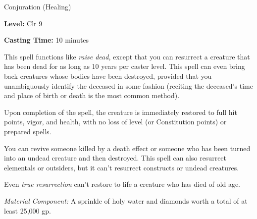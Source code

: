 
Conjuration (Healing)

\textbf{Level:} Clr 9

\textbf{Casting Time:} 10 minutes

This spell functions like \textit{raise dead}, except that you can resurrect a 
creature that has been dead for as long as 10 years per caster level. This spell 
can even bring back creatures whose bodies have been destroyed, provided that you 
unambiguously identify the deceased in some fashion (reciting the deceased's time 
and place of birth or death is the most common method).

Upon completion of the spell, the creature is immediately restored to full hit 
points, vigor, and health, with no loss of level (or Constitution points) or prepared 
spells.

You can revive someone killed by a death effect or someone who has been turned 
into an undead creature and then destroyed. This spell can also resurrect elementals 
or outsiders, but it can't resurrect constructs or undead creatures.

Even \textit{true resurrection} can't restore to life a creature who has died of 
old age.

\textit{Material Component:} A sprinkle of holy water and diamonds worth a total 
of at least 25,000 gp.

